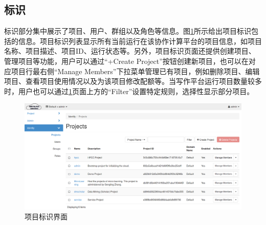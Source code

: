 \documentclass[12pt]{ctexart}%
\begin{document}
\subsection{标识}
标识部分集中展示了项目、用户、群组以及角色等信息。图\ref{fig:identityprojects}所示给出项目标识包括的信息。项目标识列表显示所有当前运行在该协作计算平台的项目信息，如项目名称、项目描述、项目ID、运行状态等。另外，项目标识页面还提供创建项目、管理项目等功能，用户可以通过“+Create Project”按钮创建新项目，也可以在对应项目行最右侧“Manage Members”下拉菜单管理已有项目，例如删除项目、编辑项目、查看项目使用情况以及为该项目修改配额等。当写作平台运行项目数量较多时，用户也可以通过\ref{fig:identityprojects}页面上方的“Filter”设置特定规则，选择性显示部分项目。
\begin{figure}[!htb]
\centering
\includegraphics[width=5in]{./figures/Identity_Projects}
\caption{项目标识界面}
\label{fig:identityprojects}
\end{figure}
\end{document}
